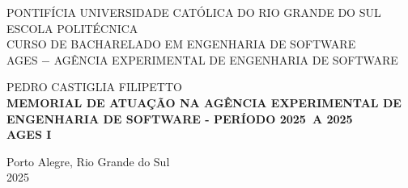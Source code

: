 \author{Gustavo}

\def\autor{\uppercase{Pedro Castiglia Filipetto}}
\def\inicio{2025}
\def\fim{2025}
\def\ages{I}
\def\local{Porto Alegre, Rio Grande do Sul}
\def\ano{2025}

\begin{capa}
  \centering
    \uppercase{
      PONTIFÍCIA UNIVERSIDADE CATÓLICA DO RIO GRANDE DO SUL\\
      ESCOLA POLITÉCNICA\\
      CURSO DE BACHARELADO EM ENGENHARIA DE SOFTWARE\\
      AGES $-$ AGÊNCIA EXPERIMENTAL DE ENGENHARIA DE SOFTWARE\\
      }

    \vfill
    \autor\\
    \vfill
    \textbf{
      \uppercase{
        Memorial de atuação na Agência Experimental de Engenharia de Software 
        {-} Período \inicio\ a \fim\
        \\AGES \ages\
      }
    }
    
    \vfill

    \vfill
    \local\\
    \ano\
  \end{capa}